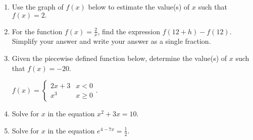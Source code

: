 \documentclass[12pt]{article}
\begin{document}
\begin{enumerate}
\quad \hfill \underline{\hspace{2in}}
\vfill

\item Use the graph of $f(x)$ below to estimate the value(s) of $x$ such that $f(x)=2.$

\quad \hfill \underline{\hspace{2in}}

\item For the function $f(x)=\frac{2}{x}$, find the expression $f(12+h)-f(12).$ Simplify your answer and write your answer as a single fraction.\\


\quad \hfill \underline{\hspace{2in}}
\vfill

\item Given the piecewise defined function below, determine the value(s) of $x$ such that $f(x)=-20.$

$f(x)=\begin{cases} 2x+3 & x <0 \\ x^3 & x \geq 0 \end{cases}.$\\

\quad \hfill \underline{\hspace{2in}}
\vfill


\item Solve for $x$ in the equation $x^2+3x=10.$

\quad \hfill \underline{\hspace{2in}}
\vfill

\newpage
\item Solve for $x$ in the equation $e^{4-7x}=\frac{1}{2}.$


\quad \hfill \underline{\hspace{2in}}
\vfill



\end{enumerate}
\end{document}
